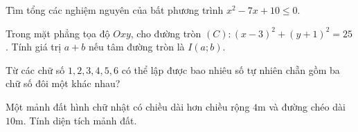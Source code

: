 
\NQuestion Tìm tổng các nghiệm nguyên của bất phương trình $x^2-7x+10\le 0$.

\NQuestion Trong mặt phẳng tọa độ $Oxy$, cho đường tròn $(C):(x-3)^2+(y+1)^2=25$. Tính giá trị $a+b$ nếu tâm đường tròn là $I(a;b)$.

\NQuestion Từ các chữ số $1,2,3,4,5,6$ có thể lập được bao nhiêu số tự nhiên chẵn gồm ba chữ số đôi một khác nhau?

\NQuestion Một mảnh đất hình chữ nhật có chiều dài hơn chiều rộng $4$m và đường chéo dài $10$m. Tính diện tích mảnh đất.

\begin{center}

\end{center}

